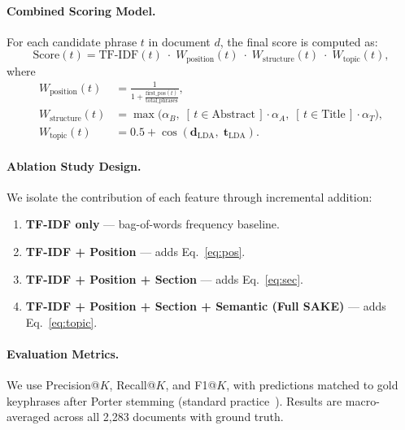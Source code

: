 \documentclass[pdflatex,sn-mathphys-num]{sn-jnl}
\begin{document}
\paragraph{Combined Scoring Model.}
For each candidate phrase $t$ in document $d$, the final score is computed as:
\begin{equation}\label{eq:score}
  \text{Score}(t) = \text{TF-IDF}(t) \;\cdot\; W_{\text{position}}(t) \;\cdot\;
                    W_{\text{structure}}(t) \;\cdot\; W_{\text{topic}}(t),
\end{equation}
where
\begin{align}
  W_{\text{position}}(t) &= \frac{1}{1 + \frac{\text{first\_pos}(t)}{\text{total\_phrases}}}, \label{eq:pos}\\[4pt]
  W_{\text{structure}}(t) &= \max\!\bigl(\alpha_B,\; [\,t \in \text{Abstract}\,]\cdot\alpha_A,\;
                             [\,t \in \text{Title}\,]\cdot\alpha_T\bigr), \label{eq:sec}\\[4pt]
  W_{\text{topic}}(t) &= 0.5 + \cos(\mathbf{d}_{\text{LDA}},\;\mathbf{t}_{\text{LDA}}). \label{eq:topic}
\end{align}

\paragraph{Ablation Study Design.}
We isolate the contribution of each feature through incremental addition:
\begin{enumerate}
  \item \textbf{TF-IDF only} --- bag-of-words frequency baseline.
  \item \textbf{TF-IDF + Position} --- adds Eq.~\eqref{eq:pos}.
  \item \textbf{TF-IDF + Position + Section} --- adds Eq.~\eqref{eq:sec}.
  \item \textbf{TF-IDF + Position + Section + Semantic (Full SAKE)} --- adds Eq.~\eqref{eq:topic}.
\end{enumerate}



\paragraph{Evaluation Metrics.}
We use Precision@$K$, Recall@$K$, and F1@$K$, with predictions matched to gold keyphrases after Porter
stemming (standard practice~\cite{florescu2017}). Results are macro-averaged across all 2,283
documents with ground truth.
\end{document}
